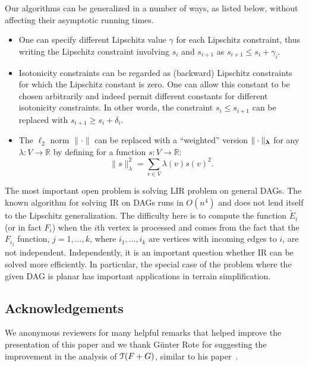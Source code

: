 \documentclass[11pt]{article}
\def\llambda{{\text{\boldmath $\lambda$}}}
\def\TT{\EuScript{T}}
\begin{document}
Our algorithms can be generalized in a number of ways, as
listed below, without affecting their asymptotic running times. 
\begin{itemize} 
\item One can specify different Lipschitz value $\gamma$ for each Lipschitz constraint, thus writing the Lipschitz constraint involving $s_i$ and $s_{i+1}$ as $s_{i+1} \leq s_i + \gamma_i$. 
\item Isotonicity constraints can be regarded as (backward) Lipschitz constraints for which the Lipschitz constant is zero. One can allow this constant to be chosen arbitrarily and indeed permit different constants for different isotonicity constraints. In other words, the constraint $s_i \leq s_{i+1}$ can be replaced with $s_{i+1} \geq s_i + \delta_i$.

\item The $\ell_2$ norm $\|\cdot\|$ can be replaced with a ``weighted'' version $\|\cdot\|_{\llambda}$ for any $\lambda: V \rightarrow \mathbb{R}$ by defining for a function $s: V \rightarrow \mathbb{R}$:  
\[
\|s\|^2_{\lambda} = \sum_{v \in V} \lambda(v)s(v)^2.
\]
\end{itemize}


The most important open problem is solving LIR problem on general DAGs. The known algorithm for solving IR on DAGs runs in $O(n^4)$ and does not lend itself to the Lipschitz generalization. The difficulty here is to compute the function $\tilde E_i$ (or in fact $F_i$) when the $i$th vertex is processed and comes from the fact that the $F_{i_j}$ function, $j = 1, \dots, k$, where $i_1, \dots, i_k$ are vertices with incoming edges to $i$, are not independent. Independently, it is an important question whether IR can be solved more efficiently. In particular, the special case of the problem where the given DAG is planar has important applications in terrain simplification. 

\subsection*{Acknowledgements}
We anonymous reviewers for many helpful remarks that helped improve the presentation of this paper and we thank G\"unter Rote for suggesting the improvement in the analysis of $\TT(F+G)$, similar to his paper~\cite{Rote}.  




\newpage

\appendix
\end{document}

